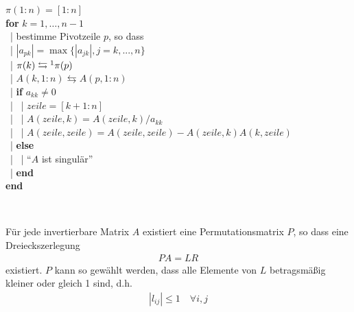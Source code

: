 \begin{pseudocode}{0.9\linewidth}
  $\pi(1 : n) = [1 : n] $  \\
  \textbf{for} $k = 1, \dots, n-1$ \\
  ~|	  \> bestimme Pivotzeile $p$, so dass\\
  ~|	  \>\>	$|a_{pk} | = \max\{|a_{jk} | , j = k, . . . , n\}$ \\
  ~|	  \> $\pi(k) \leftrightarrows\footnotemark \pi(p)$ \\
  ~|	  \> $A(k, 1 : n) \leftrightarrows A(p, 1 : n)$ \\
  ~|	  \> \textbf{if} $a_{kk} \neq 0$ \\
  ~|	  	   \>~|\> $zeile = [k + 1 : n]$ \\
  ~|	  	   \>~|\> $A(zeile, k) = A(zeile, k)/a_{kk}$ \\
  ~|	  	   \>~|\> $A(zeile, zeile) = A(zeile, zeile) - A(zeile, k)A(k, zeile)$\\
  ~|	  \> \textbf{else} \\
  ~|	  	   \>~|\> \enquote{$A$ ist singulär}\\
  ~|	  \> \textbf{end}\\
  \textbf{end}
\end{pseudocode}	
\\

\begin{Satze} \label{2.2.4} 
  Für jede invertierbare Matrix $A$ existiert eine Permutationsmatrix $P$,
  so dass eine Dreieckszerlegung
  \begin{gather*}
    PA = LR
  \end{gather*}
  existiert.
  $P$ kann so gewählt werden, dass alle Elemente von $L$ betragsmäßig kleiner oder gleich
  1 sind, d.h.
  \begin{gather*}
    |l_{ij}| \leq 1\quad \forall i, j
  \end{gather*}
\end{Satze}


